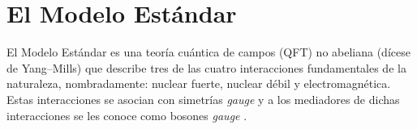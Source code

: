 



\section{El Modelo Estándar} %

El Modelo Estándar es una teoría cuántica de campos (QFT) no abeliana (dícese de Yang--Mills) que describe tres de las cuatro interacciones fundamentales de la naturaleza, nombradamente: nuclear fuerte, nuclear débil y electromagnética.
Estas interacciones se asocian con simetrías \emph{gauge} y a los mediadores de dichas interacciones se les conoce como bosones \emph{gauge} \cite{pdg2018}.

